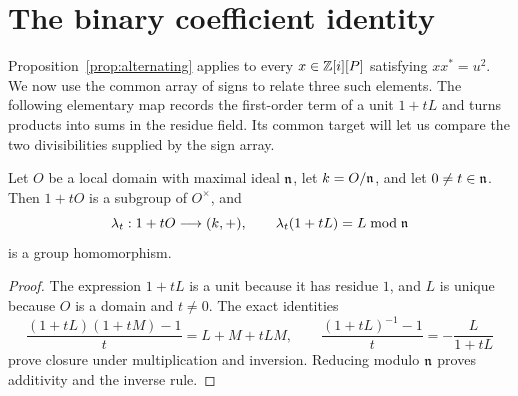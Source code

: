 \section{The binary coefficient identity}\label{sec:binary}

Proposition~\ref{prop:alternating} applies to every
\(x\in\mathbb Z[i][P]\) satisfying \(xx^*=u^2\). We now use the common array of signs to
relate three such elements. The following elementary map records the
first-order term of a unit \(1+tL\) and turns products into sums in
the residue field. Its common target will let us compare the two
divisibilities supplied by the sign array.

\begin{lemma}\label{lem:first-order}
Let \(O\) be a local domain with maximal ideal \(\mathfrak n\), let
\(k=O/\mathfrak n\), and let \(0\ne t\in\mathfrak n\). Then \(1+tO\) is a subgroup of
\(O^\times\), and
\[
 \lambda_t:1+tO\longrightarrow(k,+),\qquad
 \lambda_t(1+tL)=L\bmod\mathfrak n
\]
is a group homomorphism.
\end{lemma}

\begin{proof}
The expression \(1+tL\) is a unit because it has residue \(1\), and
\(L\) is unique because \(O\) is a domain and \(t\ne0\). The exact
identities
\[
 \frac{(1+tL)(1+tM)-1}{t}=L+M+tLM,\qquad
 \frac{(1+tL)^{-1}-1}{t}=-\frac{L}{1+tL}
\]
prove closure under multiplication and inversion. Reducing modulo
\(\mathfrak n\) proves additivity and the inverse rule.
\end{proof}

